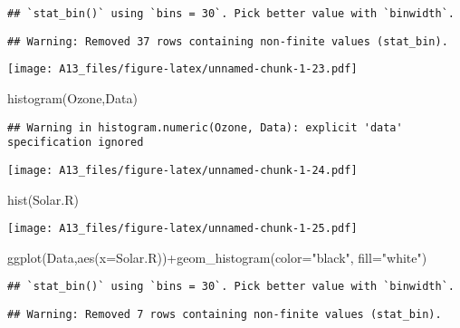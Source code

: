 \documentclass[
]{article}
\newenvironment{Shaded}{\begin{snugshade}}{\end{snugshade}}
\newcommand{\AttributeTok}[1]{\textcolor[rgb]{0.77,0.63,0.00}{#1}}
\newcommand{\FunctionTok}[1]{\textcolor[rgb]{0.00,0.00,0.00}{#1}}
\newcommand{\NormalTok}[1]{#1}
\newcommand{\SpecialCharTok}[1]{\textcolor[rgb]{0.00,0.00,0.00}{#1}}
\newcommand{\StringTok}[1]{\textcolor[rgb]{0.31,0.60,0.02}{#1}}
\begin{document}
\begin{verbatim}
## `stat_bin()` using `bins = 30`. Pick better value with `binwidth`.
\end{verbatim}

\begin{verbatim}
## Warning: Removed 37 rows containing non-finite values (stat_bin).
\end{verbatim}

\texttt{[image: A13\_files/figure-latex/unnamed-chunk-1-23.pdf]}

\begin{Shaded}
\begin{Highlighting}[]
\FunctionTok{histogram}\NormalTok{(Ozone,Data)}
\end{Highlighting}
\end{Shaded}

\begin{verbatim}
## Warning in histogram.numeric(Ozone, Data): explicit 'data' specification ignored
\end{verbatim}

\texttt{[image: A13\_files/figure-latex/unnamed-chunk-1-24.pdf]}

\begin{Shaded}
\begin{Highlighting}[]
\FunctionTok{hist}\NormalTok{(Solar.R)}
\end{Highlighting}
\end{Shaded}

\texttt{[image: A13\_files/figure-latex/unnamed-chunk-1-25.pdf]}

\begin{Shaded}
\begin{Highlighting}[]
\FunctionTok{ggplot}\NormalTok{(Data,}\FunctionTok{aes}\NormalTok{(}\AttributeTok{x=}\NormalTok{Solar.R))}\SpecialCharTok{+}\FunctionTok{geom\_histogram}\NormalTok{(}\AttributeTok{color=}\StringTok{"black"}\NormalTok{, }\AttributeTok{fill=}\StringTok{"white"}\NormalTok{)}
\end{Highlighting}
\end{Shaded}

\begin{verbatim}
## `stat_bin()` using `bins = 30`. Pick better value with `binwidth`.
\end{verbatim}

\begin{verbatim}
## Warning: Removed 7 rows containing non-finite values (stat_bin).
\end{verbatim}
\end{document}
